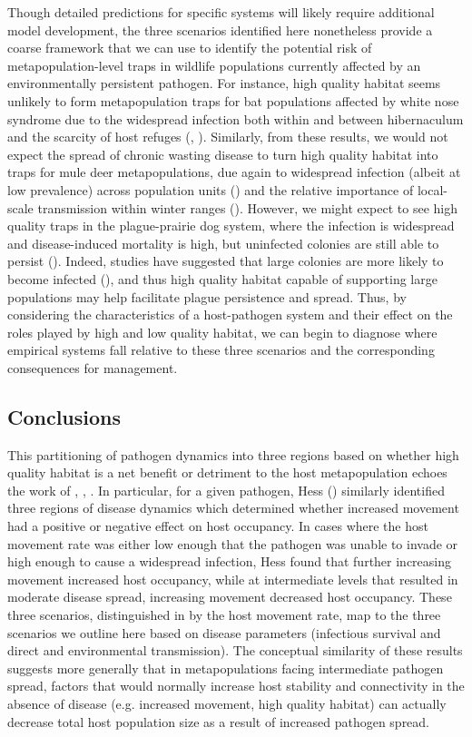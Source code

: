 \documentclass{article}
\begin{document}
Though detailed predictions for specific systems will likely require additional model development, the three scenarios identified here nonetheless provide a coarse framework that we can use to identify the potential risk of metapopulation-level traps in wildlife populations currently affected by an environmentally persistent pathogen.
For instance, high quality habitat seems unlikely to form metapopulation traps for bat populations affected by white nose syndrome due to the widespread infection both within and between hibernaculum and the scarcity of host refuges (\cite{Langwig2014}, \cite{ORegan2015}).
Similarly, from these results, we would not expect the spread of chronic wasting disease to turn high quality habitat into traps for mule deer metapopulations, due again to widespread infection (albeit at low prevalence) across population units (\cite{Conner2004}) and the relative importance of local-scale transmission within winter ranges (\cite{Farnsworth2006}).
However, we might expect to see high quality traps in the plague-prairie dog system, where the infection is widespread and disease-induced mortality is high, but uninfected colonies are still able to persist (\cite{Stapp2004}).
Indeed, studies have suggested that large colonies are more likely to become infected (\cite{Snall2008}), and thus high quality habitat capable of supporting large populations may help facilitate plague persistence and spread.
Thus, by considering the characteristics of a host-pathogen system and their effect on the roles played by high and low quality habitat, we can begin to diagnose where empirical systems fall relative to these three scenarios and the corresponding consequences for management.
 
\subsection*{Conclusions}  

This partitioning of pathogen dynamics into three regions based on whether high quality habitat is a net benefit or detriment to the host metapopulation echoes the work of \cite{Hess1996}, \cite{Gog2002}, \cite{Park2012}.
In particular, for a given pathogen, Hess (\cite{Hess1996}) similarly identified three regions of disease dynamics which determined whether increased movement had a positive or negative effect on host occupancy.  
In cases where the host movement rate was either low enough that the pathogen was unable to invade or high enough to cause a widespread infection, Hess found that further increasing movement increased host occupancy, while at intermediate levels that resulted in moderate disease spread, increasing movement decreased host occupancy.
These three scenarios, distinguished in \cite{Hess1996} by the host movement rate, map to the three scenarios we outline here based on disease parameters (infectious survival and direct and environmental transmission).
The conceptual similarity of these results suggests more generally that in metapopulations facing intermediate pathogen spread, factors that would normally increase host stability and connectivity in the absence of disease (e.g. increased movement, high quality habitat) can actually decrease total host population size as a result of increased pathogen spread.
\end{document}
